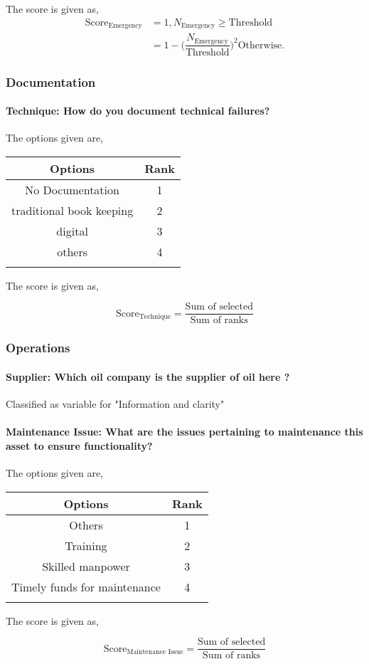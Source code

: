 \documentclass[oneside,twocolumn]{article}
\newcommand{\tsub}[2]{\text{#1}_{\text{#2}}}
\newcommand{\tsubb}[2]{#1_{\text{#2}}}
\newcommand{\dsub}[2]{\dfrac{\text{#1}}{\text{#2}}}
\newcommand{\multsel}[1]
{
	\[
		\tsub{Score}{#1} = \dsub{Sum of selected}{Sum of ranks}
	\]
}
\newenvironment{ttable}
{
\begin{center}
\begin{tabular}{c|c}
\hline
}
{
\\ \hline
\end{tabular}
\end{center}
}
\begin{document}
The score is given as,
\begin{align*}
\tsub{Score}{Emergency} &= 1, \tsubb{N}{Emergency} \ge \text{Threshold} \\
        &=
1 - \Big(\dfrac{\tsubb{N}{Emergency}}{\text{Threshold}}\Big)^{2}
\text{Otherwise}.
\end{align*}
\subsubsection{Documentation}

\paragraph{Technique: How do you document technical failures?}

The options given are,
\begin{ttable}
Options & Rank \\ \hline
No Documentation & 1 \\
traditional book keeping & 2 \\
digital & 3 \\
others & 4 \\
\hline
\end{ttable}
The score is given as,
\multsel{Technique}
\subsubsection{Operations}

\paragraph{Supplier: Which oil company is the supplier of oil here ?}

Classified as variable for "Information and         clarity"
\paragraph{Maintenance Issue: What are the issues pertaining to maintenance this asset to ensure functionality?}

The options given are,
\begin{ttable}
Options & Rank \\ \hline
Others & 1 \\
Training & 2 \\
Skilled manpower & 3 \\
Timely funds for maintenance & 4 \\
\hline
\end{ttable}
The score is given as,
\multsel{Maintenance Issue}
\end{document}
